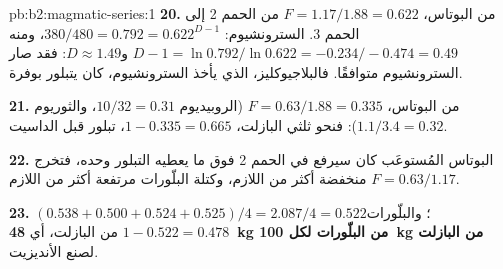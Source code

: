 \begin{solution}{pb:b2:magmatic-series:1}
\textbf{20.} من البوتاس، $F = 1.17/1.88 = 0.622$ من الحمم 2 إلى الحمم 3. السترونشيوم:
$380/480 = 0.792 = 0.622^{D - 1}$، ومنه $D - 1 = \ln 0.792/\ln 0.622 = -0.234/-0.474 =
0.49$ و$D \approx 1.49$: فقد صار السترونشيوم متوافقًا. فالبلاجيوكليز، الذي يأخذ
السترونشيوم، كان يتبلور بوفرة.

\textbf{21.} من البوتاس، $F = 0.63/1.88 = 0.335$ (الروبيديوم $10/32 = 0.31$، والثوريوم
$1.1/3.4 = 0.32$): فنحو ثلثي البازلت، $1 - 0.335 = 0.665$، تبلور
قبل الداسيت.

\textbf{22.} البوتاس المُستوعَب كان سيرفع  في الحمم 2 فوق ما
يعطيه التبلور وحده، فتخرج $F = 0.63/1.17$ منخفضة أكثر من اللازم، وكتلة
البلّورات مرتفعة أكثر من اللازم.

\textbf{23.} $(0.538 + 0.500 + 0.524 + 0.525)/4 = 2.087/4 = 0.522$؛ والبلّورات $1 - 0.522
= 0.478$ من البازلت، أي \textbf{\qty[text-series-to-math=true]{48}{kg} من
البلّورات لكل \qty{100}{kg} من البازلت} لصنع الأنديزيت.
\end{solution}
